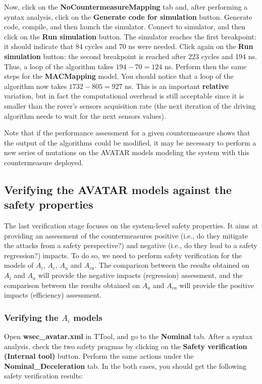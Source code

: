 \documentclass{article}
\begin{document}
Now, click on the \textbf{NoCountermeasureMapping} tab and, after performing a syntax analysis, click on the \textbf{Generate code for simulation} button. Generate code, compile, and then launch the simulator. Connect to simulator, and then click on the \textbf{Run simulation} button. The simulator reaches the first breakpoint: it should indicate that 84 cycles and 70 ns were needed. Click again on the \textbf{Run simulation} button: the second breakpoint is reached after 223 cycles and 194 ns. Thus, a loop of the algorithm takes $194 - 70 = 124$ ns. Perform then the same steps for the \textbf{MACMapping} model. You should notice that a loop of the algorithm now takes $1732 - 805 = 927$ ns. This is an important \textbf{relative} variation, but in fact the computational overhead is still acceptable since it is smaller than the rover's sensors acquisition rate (the next iteration of the driving algorithm needs to wait for the next sensors values).

Note that if the performance assessment for a given countermeasure shows that the output of the algorithms could be modified, it may be necessary to perform a new series of mutations on the AVATAR models modeling the system with this countermeasure deployed.


\subsection{Verifying the AVATAR models against the safety properties}

The last verification stage focuses on the system-level safety properties. It aims at providing an assessment of the countermeasures positive (i.e., do they mitigate the attacks from a safety perspective?) and negative (i.e., do they lead to a safety regression?) impacts. To do so, we need to perform safety verification for the models of $A_i$, $A_c$, $A_a$ and $A_{c a}$. The comparison between the results obtained on $A_i$ and $A_a$ will provide the negative impacts (regression) assessment, and the comparison between the results obtained on $A_a$ and $A_{c a}$ will provide the positive impacts (efficiency) assessment.

\subsubsection{Verifying the $A_i$ models}

Open \textbf{wsec\_avatar.xml} in TTool, and go to the \textbf{Nominal} tab. After a syntax analysis, check the two safety pragmas by clicking on the \textbf{Safety verification (Internal tool)} button. Perform the same actions under the \textbf{Nominal\_Deceleration} tab. In the both cases, you should get the following safety verification results:
\end{document}
